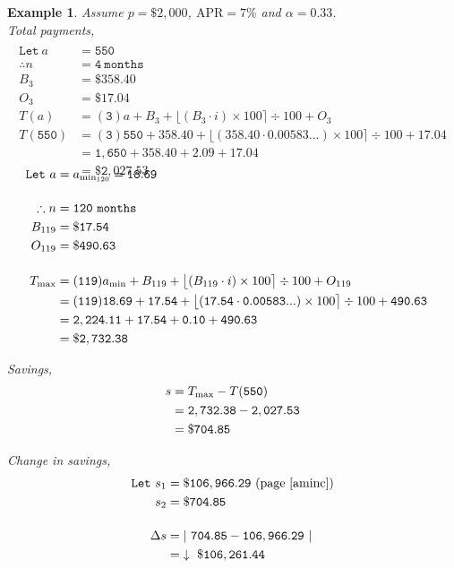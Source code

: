 \documentclass[12pt,letterpaper,oneside]{article}
\newtheorem{example}{Example}[section]
\theoremstyle{remark} %
\begin{document}
	\newpage
	\begin{example}
	Assume $p=\$2,000$, $\mbox{APR}=7\%$ and $\alpha=0.33$.\\[12pt]
	Total payments,
	\begin{align*}
	\\\mathtt{Let\ } a&=\mathtt{550}\\[12pt]
	\therefore n&=\mathtt{4\ months}\\
	B_{3}&=\mathtt{\$358.40}\\
	O_{3}&=\mathtt{\$17.04}\\[12pt]
	T(a)&=(\mathtt{3}) a+B_{3}+\big\lfloor{\left(B_{3}\cdot i\right)\times 100}\big\rceil\div 100+O_{3}\\
	T(\mathtt{550})&=(\mathtt{3}) \mathtt{550}+\mathtt{358.40}+\big\lfloor{\left(\mathtt{358.40}\cdot \mathtt{0.00583...}\right)\times 100}\big\rceil\div 100+\mathtt{17.04}\\
	&=\mathtt{1,650}+\mathtt{358.40}+\mathtt{2.09}+\mathtt{17.04}\\
	&=\mathtt{\$2,027.53}
	\end{align*}

	\label{amind}
	\begin{align*}\\[-36pt]
	\mathtt{Let\ } a&=a_{\rm{min_{120}}}=\mathtt{18.69}\\[12pt]
	\therefore n&=\mathtt{120\ months}\\
	B_{119}&=\mathtt{\$17.54}\\
	O_{119}&=\mathtt{\$490.63}\\[12pt]		
	T_{\rm{max}}&=(\mathtt{119}) a_{\rm{min}}+B_{119}+\big\lfloor{\left(B_{119}\cdot i\right)\times 100}\big\rceil\div 100+O_{119}\\
	&=(\mathtt{119}) \mathtt{18.69}+\mathtt{17.54}+\big\lfloor{\left(\mathtt{17.54}\cdot \mathtt{0.00583...}\right)\times 100}\big\rceil\div 100+\mathtt{490.63}\\
	&=\mathtt{2,224.11}+\mathtt{17.54}+\mathtt{0.10}+\mathtt{490.63}\\
	&=\mathtt{\$2,732.38}
	\end{align*}

	\vspace{12pt}
	Savings,
	\begin{align*}
	s&=T_{\rm{max}}-T(\mathtt{550})\\
	&=\mathtt{2,732.38}-\mathtt{2,027.53}\\
	&=\mathtt{\$704.85}
	\end{align*}
	
	Change in savings,
	\begin{align*}
	\mathtt{Let\ }s_{1}&=\mathtt{\$106,966.29}\ \mbox{(page\ \pageref{aminc})}\\
	s_{2}&=\mathtt{\$704.85}\\[12pt]
	\Delta s&=\left|\ \mathtt{704.85}-\mathtt{106,966.29}\ \right|\\
	&=\mathtt{\downarrow\ \$106,261.44}
	\end{align*}


\end{example}
\end{document}
